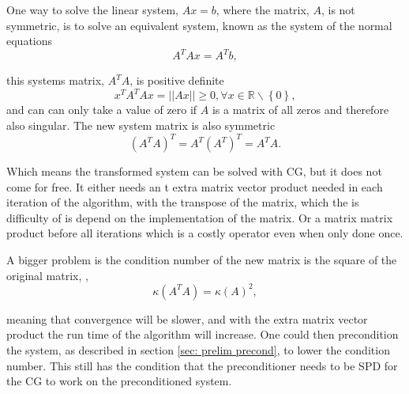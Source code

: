 One way to solve the linear system, \(Ax=b\), where the matrix, \(A\), is not symmetric, is to solve an equivalent system, known as the system of the normal equations
\begin{equation}\label{eq: normal eq}
    A^TAx=A^Tb,
\end{equation}

\noindent this systems matrix, \(A^TA\), is positive definite
\begin{equation}
    x^TA^TAx=||Ax||\geq 0, \forall x \in \mathbb{R}\backslash \left\lbrace 0\right\rbrace,
\end{equation}
and can can only take a value of zero if \(A\) is a matrix of all zeros and therefore also singular. The new system matrix is also symmetric
\begin{equation}
    (A^TA)^T=A^T(A^T)^T=A^TA.
\end{equation}

Which means the transformed system can be solved with CG, but it does not come for free. It either needs an t extra matrix vector product needed in each iteration of the algorithm, with the transpose of the matrix, which the is difficulty of is depend on the implementation of the matrix. Or a matrix matrix product before all iterations which is a costly operator even when only done once.

\noindent A bigger problem is the condition number of the new matrix is the square of the original matrix, \cite{Saad2003},
\begin{equation*}
    \kappa(A^TA)=\kappa(A)^2,
\end{equation*}

\noindent meaning that convergence will be slower, and with the extra matrix vector product the run time of the algorithm will increase. One could then precondition the system, as described in section \ref{sec: prelim precond}, to lower the condition number. This still has the condition that the preconditioner needs to be SPD for the CG to work on the preconditioned system.